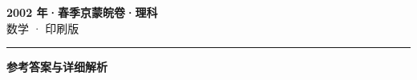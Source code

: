 \documentclass[zihao=5, a4paper]{ctexart}
\begin{document}
\begin{center}
  {\Large\bfseries 2002 年·春季京蒙皖卷·理科}\\[4pt]
  {\large 数学 · 印刷版}
\end{center}
\medskip
{}

\par\bigskip\hrule\bigskip
{}
\begin{center}{\large\bfseries 参考答案与详细解析}\end{center}
\smallskip

\end{document}

